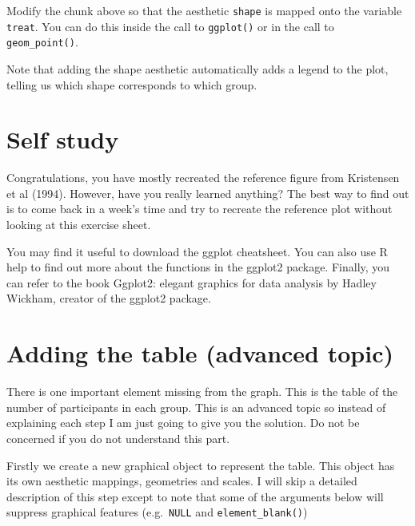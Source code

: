 \documentclass[
]{book}
\theoremstyle{definition}
\theoremstyle{definition}
\theoremstyle{definition}
\theoremstyle{definition}
\theoremstyle{remark}
\begin{document}
Modify the chunk above so that the aesthetic \texttt{shape} is mapped onto the variable \texttt{treat}. You can do this inside the call to \texttt{ggplot()} or in the call to \texttt{geom\_point()}.

Note that adding the shape aesthetic automatically adds a legend to the plot, telling us which shape corresponds to which group.

\section{Self study}\label{self-study}

Congratulations, you have mostly recreated the reference figure from Kristensen et al (1994). However, have you really learned anything? The best way to find out is to come back in a week's time and try to recreate the reference plot without looking at this exercise sheet.

You may find it useful to download the ggplot cheatsheet. You can also use R help to find out more about the functions in the ggplot2 package. Finally, you can refer to the book Ggplot2: elegant graphics for data analysis by Hadley Wickham, creator of the ggplot2 package.

\section{Adding the table (advanced topic)}\label{adding-the-table-advanced-topic}

There is one important element missing from the graph. This is the table of the number of participants in each group. This is an advanced topic so instead of explaining each step I am just going to give you the solution. Do not be concerned if you do not understand this part.

Firstly we create a new graphical object to represent the table. This object has its own aesthetic mappings, geometries and scales. I will skip a detailed description of this step except to note that some of the arguments below will suppress graphical features (e.g.~\texttt{NULL} and \texttt{element\_blank()})
\end{document}
